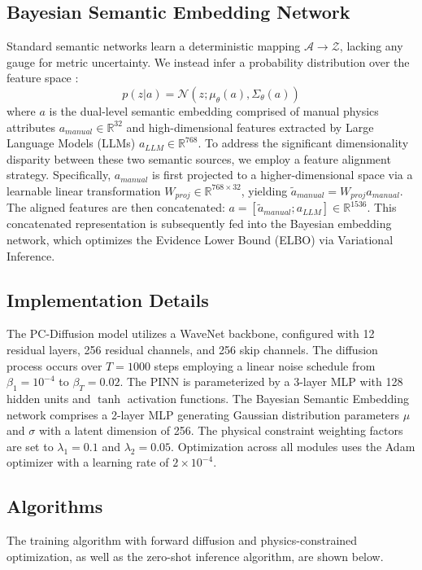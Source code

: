 \subsection{Bayesian Semantic Embedding Network}
Standard semantic networks learn a deterministic mapping $\mathcal{A} \rightarrow \mathcal{Z}$, lacking any gauge for metric uncertainty. We instead infer a probability distribution over the feature space \cite{blundell2015weight,jordan1999introduction}:
\begin{equation}
    p(z|a) = \mathcal{N}(z; \mu_\theta(a), \Sigma_\theta(a))
\end{equation}
where $a$ is the dual-level semantic embedding comprised of manual physics attributes $a_{manual} \in \mathbb{R}^{32}$ and high-dimensional features extracted by Large Language Models (LLMs) $a_{LLM} \in \mathbb{R}^{768}$. To address the significant dimensionality disparity between these two semantic sources, we employ a feature alignment strategy. Specifically, $a_{manual}$ is first projected to a higher-dimensional space via a learnable linear transformation $W_{proj} \in \mathbb{R}^{768 \times 32}$, yielding $\tilde{a}_{manual} = W_{proj} a_{manual}$. The aligned features are then concatenated: $a = [\tilde{a}_{manual}; a_{LLM}] \in \mathbb{R}^{1536}$. This concatenated representation is subsequently fed into the Bayesian embedding network, which optimizes the Evidence Lower Bound (ELBO) via Variational Inference.

\subsection{Implementation Details}
The PC-Diffusion model utilizes a WaveNet backbone, configured with 12 residual layers, 256 residual channels, and 256 skip channels. The diffusion process occurs over $T = 1000$ steps employing a linear noise schedule from $\beta_1 = 10^{-4}$ to $\beta_T = 0.02$. The PINN is parameterized by a 3-layer MLP with 128 hidden units and $\tanh$ activation functions. The Bayesian Semantic Embedding network comprises a 2-layer MLP generating Gaussian distribution parameters $\mu$ and $\sigma$ with a latent dimension of 256. The physical constraint weighting factors are set to $\lambda_1 = 0.1$ and $\lambda_2 = 0.05$. Optimization across all modules uses the Adam optimizer with a learning rate of $2 \times 10^{-4}$.

\subsection{Algorithms}
The training algorithm with forward diffusion and physics-constrained optimization, as well as the zero-shot inference algorithm, are shown below.

